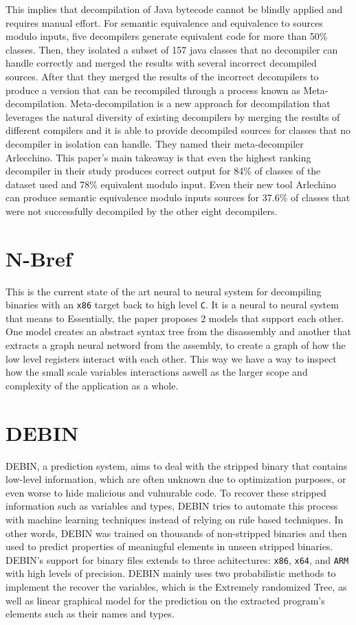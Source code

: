 \documentclass{article}
\begin{document}
This implies that decompilation of Java bytecode cannot be blindly applied and requires manual effort.
For semantic equivalence and equivalence to sources modulo inputs, five decompilers
generate equivalent code for more than 50\% classes.
Then, they isolated a subset of 157 java classes that no decompiler can handle correctly and merged the results with several incorrect decompiled sources.
After that they merged the results of the incorrect decompilers to produce a version that can be recompiled through a process known as Meta-decompilation.
Meta-decompilation is a new approach for decompilation that leverages the natural diversity of existing decompilers by merging the results of different compilers and it is able to provide decompiled sources for classes that no decompiler in isolation can handle.
They named their meta-decompiler Arlecchino.
This paper’s main takeaway is that even the highest ranking decompiler in their study produces correct output for 84\% of classes of the dataset used and 78\%
equivalent modulo input.
Even their new tool Arlechino can produce semantic equivalence modulo inputs sources for 37.6\% of classes that were not successfully decompiled by the other eight decompilers.

\section{N-Bref}

This is the current state of the art neural to neural system for decompiling binaries with an \verb|x86| target back to high level \verb|C|.
It is a neural to neural system that means to 
Essentially, the paper proposes 2 models that support each other.
One model creates an abstract syntax tree from the disassembly and another that extracts a graph neural netword from the assembly, to create a graph of how the low level registers interact with each other.
This way we have a way to inspect how the small scale variables interactions aswell as the larger scope and complexity of the application as a whole.

\section{DEBIN}

DEBIN, a prediction system, aims to deal with the stripped binary that contains low-level information, which are often unknown due to optimization purposes, or even worse to hide malicious and vulnurable code.
To recover these stripped information such as variables and types, DEBIN tries to automate this process with machine learning techniques instead of relying on rule based techniques. In other words, DEBIN was trained on thousands of non-stripped binaries and then used to predict properties of meaningful elements in unseen stripped binaries. 
DEBIN's support for binary files extends to three achitectures: \verb|x86|, \verb|x64|, and \verb|ARM| with high levels of precision.
DEBIN mainly uses two probabilistic methods to implement the recover the variables, which is the Extremely randomized Tree, as well as linear graphical model for the prediction on the extracted program's elements such as their names and types.\\
\end{document}
